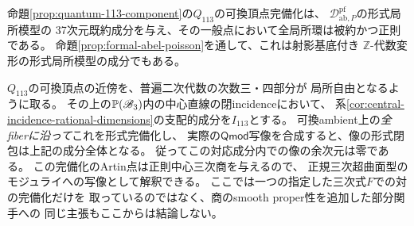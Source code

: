\begin{corollary}[37次元成分と中心incidenceの形式像]
\label{cor:formal-113-component}
命題\ref{prop:quantum-113-component}の$Q_{113}$の可換頂点完備化は、
$\mathcal D^{\mathrm{pf}}_{\mathrm{ab},P}$の形式局所模型の
37次元既約成分を与え、その一般点において全局所環は被約かつ正則である。
命題\ref{prop:formal-abel-poisson}を通して、これは射影基底付き
$\mathbb Z$-代数変形の形式局所模型の成分でもある。

$Q_{113}$の可換頂点の近傍を、普遍二次代数の次数三・四部分が
局所自由となるように取る。
その上の$\mathbb P(\mathscr B_3)$内の中心直線の閉incidenceにおいて、
系\ref{cor:central-incidence-rational-dimensions}の支配的成分を$I_{113}$とする。
可換ambient上の\emph{全fiberに沿って}これを形式完備化し、
実際の$\mathsf{Qmod}$写像を合成すると、像の形式閉包は上記の成分全体となる。
従ってこの対応成分内での像の余次元は零である。
この完備化のArtin点は正則中心三次商を与えるので、
正規三次超曲面型のモジュライへの写像として解釈できる。
ここでは一つの指定した三次式$F$での対の完備化だけを
取っているのではなく、商のsmooth proper性を追加した部分関手への
同じ主張もここからは結論しない。
\end{corollary}
